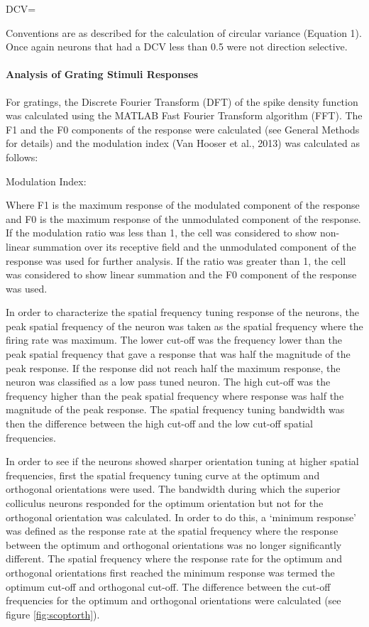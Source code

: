 	DCV=
	
	Conventions are as described for the calculation of circular variance (Equation 1). Once again neurons that had a DCV less than 0.5 were not direction selective.
	
	\paragraph{Analysis of Grating Stimuli Responses}
	
	For gratings, the Discrete Fourier Transform (DFT) of the spike density function was calculated using the MATLAB Fast Fourier Transform algorithm (FFT). The F1 and the F0 components of the response were calculated (see General Methods for details) and the modulation index (Van Hooser et al., 2013) was calculated as follows:
	
	Modulation Index:
	
	Where F1 is the maximum response of the modulated component of the response and F0 is the maximum response of the unmodulated component of the response. If the modulation ratio was less than 1, the cell was considered to show non-linear summation over its receptive field and the unmodulated component of the response was used for further analysis. If the ratio was greater than 1, the cell was considered to show linear summation and the F0 component of the response was used.
	
	In order to characterize the spatial frequency tuning response of the neurons, the peak spatial frequency of the neuron was taken as the spatial frequency where the firing rate was maximum. The lower cut-off was the frequency lower than the peak spatial frequency that gave a response that was half the magnitude of the peak response. If the response did not reach half the maximum response, the neuron was classified as a low pass tuned neuron. The high cut-off was the frequency higher than the peak spatial frequency where response was half the magnitude of the peak response. The spatial frequency tuning bandwidth was then the difference between the high cut-off and the low cut-off spatial frequencies.
	
	In order to see if the neurons showed sharper orientation tuning at higher spatial frequencies, first the spatial frequency tuning curve at the optimum and orthogonal orientations were used. The bandwidth during which the superior colliculus neurons responded for the optimum orientation but not for the orthogonal orientation was calculated. In order to do this, a ‘minimum response’ was defined as the response rate at the spatial frequency where the response between the optimum and orthogonal orientations was no longer significantly different. The spatial frequency where the response rate for the optimum and orthogonal orientations first reached the minimum response was termed the optimum cut-off and orthogonal cut-off. The difference between the cut-off frequencies for the optimum and orthogonal orientations were calculated (see figure \ref{fig:scoptorth}).
	
